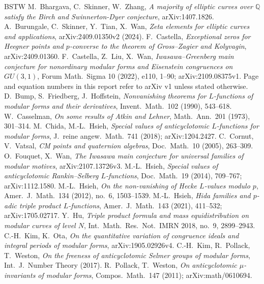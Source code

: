 \documentclass[11pt]{amsart}
\theoremstyle{definition}
\theoremstyle{remark}
\newcommand{\Q}{\mathbb{Q}}
\begin{document}
\begin{thebibliography}{BSTW}
 M.~Bhargava, C.~Skinner, W.~Zhang, \emph{A majority of elliptic curves over $\Q$ satisfy the Birch and Swinnerton-Dyer conjecture}, arXiv:1407.1826.
 A.~Burungale, C.~Skinner, Y.~Tian, X.~Wan, \emph{Zeta elements for elliptic curves and applications}, arXiv:2409.01350v2 (2024).
 F.~Castella, \emph{Exceptional zeros for Heegner points and $p$-converse to the theorem of Gross--Zagier and Kolyvagin}, arXiv:2409.01360.
 F.~Castella, Z.~Liu, X.~Wan, \emph{Iwasawa--Greenberg main conjecture for nonordinary modular forms and Eisenstein congruences on $GU(3,1)$}, Forum Math.\ Sigma 10 (2022), e110, 1--90; arXiv:2109.08375v1. Page and equation numbers in this report refer to arXiv v1 unless stated otherwise.
 D.~Bump, S.~Friedberg, J.~Hoffstein, \emph{Nonvanishing theorems for $L$-functions of modular forms and their derivatives}, Invent.\ Math.\ 102 (1990), 543--618.
 W.~Casselman, \emph{On some results of Atkin and Lehner}, Math.\ Ann.\ 201 (1973), 301--314.
 M.~Chida, M.-L.~Hsieh, \emph{Special values of anticyclotomic $L$-functions for modular forms}, J.\ reine angew.\ Math.\ 741 (2018); arXiv:1204.2427.
 C.~Cornut, V.~Vatsal, \emph{CM points and quaternion algebras}, Doc.\ Math.\ 10 (2005), 263--309.
 O.~Fouquet, X.~Wan, \emph{The Iwasawa main conjecture for universal families of modular motives}, arXiv:2107.13726v3.
 M.-L.~Hsieh, \emph{Special values of anticyclotomic Rankin--Selberg $L$-functions}, Doc.\ Math.\ 19 (2014), 709--767; arXiv:1112.1580.
 M.-L.~Hsieh, \emph{On the non-vanishing of Hecke $L$-values modulo $p$}, Amer.\ J.\ Math.\ 134 (2012), no.~6, 1503--1539.
 M.-L.~Hsieh, \emph{Hida families and $p$-adic triple product $L$-functions}, Amer.\ J.\ Math.\ 143 (2021), 411--532; arXiv:1705.02717.
 Y.~Hu, \emph{Triple product formula and mass equidistribution on modular curves of level $N$}, Int.\ Math.\ Res.\ Not.\ IMRN 2018, no.~9, 2899--2943.
 C.-H.~Kim, K.~Ota, \emph{On the quantitative variation of congruence ideals and integral periods of modular forms}, arXiv:1905.02926v4.
 C.-H.~Kim, R.~Pollack, T.~Weston, \emph{On the freeness of anticyclotomic Selmer groups of modular forms}, Int.\ J.\ Number Theory (2017).
 R.~Pollack, T.~Weston, \emph{On anticyclotomic $\mu$-invariants of modular forms}, Compos.\ Math.\ 147 (2011); arXiv:math/0610694.

\end{thebibliography}
\end{document}
